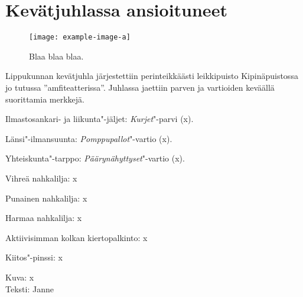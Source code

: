 \section{Kevätjuhlassa ansioituneet}

\begin{figure}[!b]
\centering\texttt{[image: example-image-a]}
\caption{Blaa blaa blaa.}
\end{figure}

\begin{multicols}{2}
\noindent Lippukunnan kevätjuhla järjestettiin perinteikkäästi leikkipuisto Kipinäpuistossa jo tutussa ''amfiteatterissa''. Juhlassa jaettiin parven ja vartioiden keväällä suorittamia merkkejä.

Ilmastosankari- ja liikunta"-jäljet: \textit{Kurjet}"-parvi (x).

Länsi"-ilmansuunta: \textit{Pomppupallot}"-vartio (x).

Yhteiskunta"-tarppo: \textit{Päärynähyttyset}"-vartio (x).

Vihreä nahkalilja: x

Punainen nahkalilja: x

Harmaa nahkalilja: x

Aktiivisimman kolkan kiertopalkinto: x

Kiitos"-pinssi: x
\end{multicols}

\medskip

\noindent\null\hfill Kuva: x\\ 
\noindent\null\hfill Teksti: Janne
